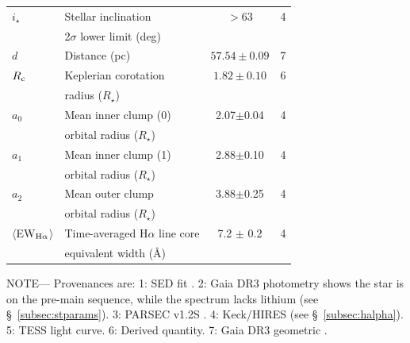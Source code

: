 \documentclass{nature3}
\begin{document}
\begin{table}
\begin{tabular}{llcc}
%
$i_\star$\dotfill                       & Stellar inclination\dotfill                                    & 	$>$63           & 4 \\
                                        & \hspace{3pt}  2$\sigma$ lower limit (deg)	                     &                      \\
%
$d$\dotfill                             & Distance (pc)\dotfill                                          & $57.54 \pm 0.09$ & 7 \\
%
$R_{\rm c}$\dotfill		                  & Keplerian corotation\dotfill                                   & $1.82 \pm 0.10$  & 6 \\
                                        & \hspace{3pt} radius ($R_\star$)	                               &                      \\
%
$a_0$\dotfill                           & Mean inner clump (0)\hspace{9pt}\dotfill           &  2.07$\pm$0.04   & 4 \\
                                        & \hspace{3pt} orbital radius ($R_\star$)	                       &                      \\
%
$a_1$\dotfill                           & Mean inner clump (1)\hspace{9pt}\dotfill           &  2.88$\pm$0.10   & 4 \\
                                        & \hspace{3pt} orbital radius ($R_\star$)	                       &                      \\
%
$a_2$\dotfill                           & Mean outer clump\hspace{9pt}\dotfill           &  3.88$\pm$0.25   & 4 \\
                                        & \hspace{3pt} orbital radius ($R_\star$)	                       &                      \\
%
$\langle$EW$_{\rm H\alpha}$$\rangle$    & Time-averaged H$\alpha$ line core                              &  7.2 $\pm$ 0.2   & 4 \\ 
                                        & \hspace{3pt} equivalent width (\AA)	                           &                      \\
\hline
\end{tabular}
\begin{flushleft}
\footnotesize{ \textsc{NOTE}---
Provenances are:
1: SED fit \cite{Bouma2024}.
2: Gaia DR3 photometry shows the star is on the pre-main sequence,
   while the spectrum lacks lithium (see \S~\ref{subsec:stparams}).
3: PARSEC v1.2S \cite{Chen2014}.
4: Keck/HIRES (see \S~\ref{subsec:halpha}).
5: TESS light curve.
6: Derived quantity.
7: Gaia DR3 geometric \cite{GaiaDR3}.
}
\end{flushleft}
\vspace{-0.5cm}
\end{table}
\end{document}
